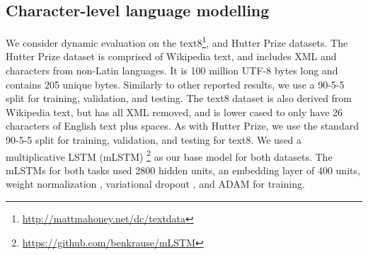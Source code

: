\documentclass{article} \usepackage{iclr2018_conference,times}
\begin{document}
\subsection{Character-level language modelling}
\label{sec:char}
We consider dynamic evaluation on the text8\footnote{\url{http://mattmahoney.net/dc/textdata}}, and Hutter Prize \citep{Hutter-2006} datasets. The Hutter Prize dataset is comprised of Wikipedia text, and includes XML and characters from non-Latin languages. It is 100 million UTF-8 bytes long and contains 205 unique bytes. Similarly to other reported results, we use a 90-5-5 split for training, validation, and testing. The text8 dataset is also derived from Wikipedia text, but has all XML removed, and is lower cased to only have 26 characters of English text plus spaces. As with Hutter Prize, we use the standard 90-5-5 split for training, validation, and testing for text8. We used a multiplicative LSTM (mLSTM) \citep{krause2016}\footnote{\url{https://github.com/benkrause/mLSTM}} as our base model for both datasets. The mLSTMs for both tasks used 2800 hidden units, an embedding layer of 400 units, weight normalization \citep{salimans2016}, variational dropout \citep{gal2016}, and ADAM \citep{kingma2014} for training. 
\end{document}
